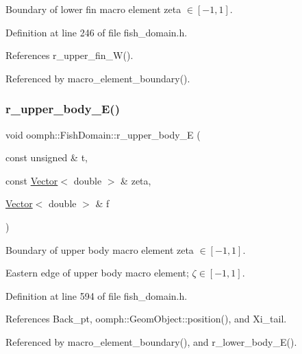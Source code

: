 Boundary of lower fin macro element zeta $ \in [-1,1] $. 



Definition at line 246 of file fish\+\_\+domain.\+h.



References r\+\_\+upper\+\_\+fin\+\_\+\+W().



Referenced by macro\+\_\+element\+\_\+boundary().

\mbox{\label{classoomph_1_1FishDomain_a47bdf57eebfa025628e70da2a1ab9e19}} 
\subsubsection{\texorpdfstring{r\+\_\+upper\+\_\+body\+\_\+\+E()}{r\_upper\_body\_E()}}
{\footnotesize\ttfamily void oomph\+::\+Fish\+Domain\+::r\+\_\+upper\+\_\+body\+\_\+E (\begin{DoxyParamCaption}\item[{const unsigned \&}]{t,  }\item[{const \hyperlink{classoomph_1_1Vector}{Vector}$<$ double $>$ \&}]{zeta,  }\item[{\hyperlink{classoomph_1_1Vector}{Vector}$<$ double $>$ \&}]{f }\end{DoxyParamCaption})\hspace{0.3cm}{\ttfamily [private]}}



Boundary of upper body macro element zeta $ \in [-1,1] $. 

Eastern edge of upper body macro element; $ \zeta \in [-1,1] $. 

Definition at line 594 of file fish\+\_\+domain.\+h.



References Back\+\_\+pt, oomph\+::\+Geom\+Object\+::position(), and Xi\+\_\+tail.



Referenced by macro\+\_\+element\+\_\+boundary(), and r\+\_\+lower\+\_\+body\+\_\+\+E().

\mbox{\label{classoomph_1_1FishDomain_a45f1d71d2cf6f4102486b04362ba8b0b}} 
